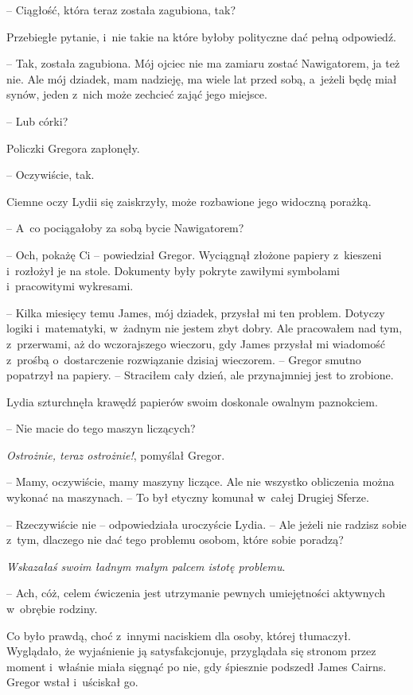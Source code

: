 \documentclass[oneside,polish,12pt,sfheadings]{mwbk}
\begin{document}
-- Ciągłość, która teraz została zagubiona, tak?

Przebiegłe pytanie, i~nie takie na które byłoby polityczne dać pełną
odpowiedź.

-- Tak, została zagubiona. Mój ojciec nie ma zamiaru zostać Nawigatorem,
ja też nie. Ale mój dziadek, mam nadzieję, ma wiele lat przed sobą, a~jeżeli będę miał synów, jeden z~nich może zechcieć zająć jego miejsce.

-- Lub córki?

Policzki Gregora zapłonęły. 

-- Oczywiście, tak.

Ciemne oczy Lydii się zaiskrzyły, może rozbawione jego widoczną porażką.

-- A~co pociągałoby za sobą bycie Nawigatorem?

-- Och, pokażę Ci -- powiedział Gregor. Wyciągnął złożone papiery z~kieszeni i~rozłożył je na stole. Dokumenty były pokryte zawiłymi
symbolami i~pracowitymi wykresami.

-- Kilka miesięcy temu James, mój dziadek, przysłał mi ten problem.
Dotyczy logiki i~matematyki, w~żadnym nie jestem zbyt dobry. Ale
pracowałem nad tym, z~przerwami, aż do wczorajszego wieczoru, gdy James
przysłał mi wiadomość z~prośbą o~dostarczenie rozwiązanie dzisiaj
wieczorem. -- Gregor smutno popatrzył na papiery. -- Straciłem cały dzień,
ale przynajmniej jest to zrobione.

Lydia szturchnęła krawędź papierów swoim doskonale owalnym paznokciem. 

-- Nie macie do tego maszyn liczących?

\emph{Ostrożnie, teraz ostrożnie!}, pomyślał
Gregor.  

-- Mamy, oczywiście, mamy maszyny
liczące. Ale nie wszystko obliczenia można wykonać na maszynach. -- To
był etyczny komunał w~całej Drugiej Sferze.

-- Rzeczywiście nie -- odpowiedziała uroczyście Lydia. -- Ale jeżeli nie
radzisz sobie z~tym, dlaczego nie dać tego problemu osobom, które sobie
poradzą?

\emph{Wskazałaś swoim ładnym małym palcem istotę problemu}. 

-- Ach, cóż, celem ćwiczenia jest utrzymanie pewnych umiejętności
aktywnych w~obrębie rodziny.

Co było prawdą, choć z~innymi naciskiem dla osoby, której tłumaczył.
Wyglądało, że wyjaśnienie ją satysfakcjonuje, przyglądała się stronom
przez moment i~właśnie miała sięgnąć po nie, gdy śpiesznie podszedł
James Cairns. Gregor wstał i~uściskał go.
\end{document}
